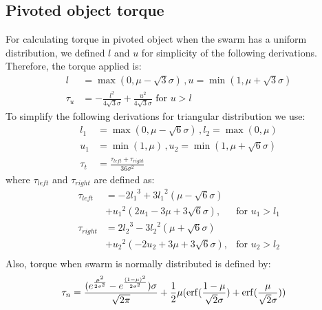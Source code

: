 \subsection{Pivoted object torque}
For calculating torque in pivoted object when the swarm has a uniform distribution, we defined $l$ and $u$ for simplicity of the following derivations. Therefore, the torque applied is:
\begin{align}
l &= \max(0,\mu -\sqrt{3} \sigma) \, , u = \min({1,\mu+\sqrt{3}\sigma})\\
\tau_u &= -\frac{l^2}{4\sqrt{3}\sigma}+ \frac{u^2}{4\sqrt{3}\sigma} \textrm{  for    }  u>l
\end{align}
To simplify the following derivations for triangular distribution we use:
\begin{align}
l_1 &= \max({0,\mu-\sqrt{6}\sigma})\, , l_2 = \max({0,\mu})\\ \nonumber
u_1 &= \min({1,\mu})\, , u_2 = \min({1,\mu+\sqrt{6}\sigma})\\ \nonumber
\tau_t &= \frac{\tau_{left} + \tau_{right}}{36\sigma^2}\nonumber
\end{align}
where $\tau_{left}$ and $\tau_{right}$ are defined as:
\begin{align}
\tau_{left} &=  -2{l_1}^3+3{l_1}^2(\mu-\sqrt{6}\sigma)\\ \nonumber
&+{u_1}^2(2u_1 - 3\mu+3\sqrt{6}\sigma), & \textrm{for     } u_1 > l_1\\ \nonumber
\tau_{right} &= 2{l_2}^3-3{l_2}^2(\mu+\sqrt{6}\sigma)\\ \nonumber
&+{u_2}^2(-2u_2 + 3\mu+3\sqrt{6}\sigma),  & \textrm{for     } u_2 > l_2\\ \nonumber
\end{align}
Also, torque when swarm is normally distributed is defined by:
\begin{align} \nonumber
\tau_n &= \frac{(e^{\frac{\mu^2}{2\sigma^2}}-e^{\frac{(1-\mu)^2}{2\sigma^2}})\sigma}{\sqrt{2\pi}}+ \frac{1}{2}\mu(\operatorname{erf}(\frac{1-\mu}{\sqrt{2}\sigma})+\operatorname{erf}(\frac{\mu}{\sqrt{2}\sigma})) 
\end{align}










